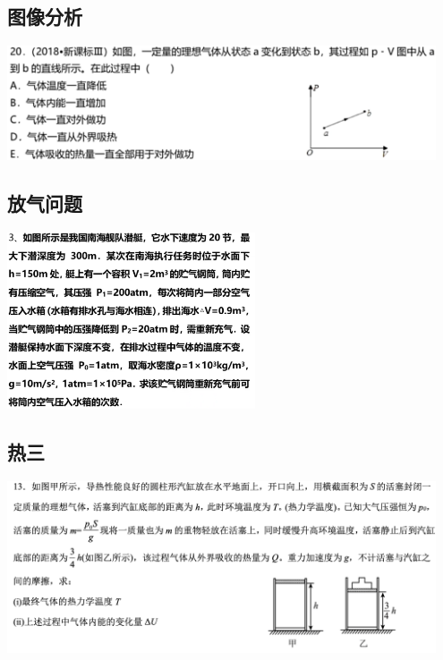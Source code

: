 \documentclass{article}
\begin{document}
\vspace{2em}

\subsection{图像分析}
\includegraphics[width=0.95\textwidth,keepaspectratio]{./pictures/2.3-36.png}

\vspace{2em}

\subsection{放气问题}
\includegraphics[width=0.55\textwidth,keepaspectratio]{./pictures/2.3-11.png}

\vspace{5em}

\subsection{热三}
\includegraphics[width=0.95\textwidth,keepaspectratio]{./pictures/2.3-39.png}

\newpage
\end{document}
